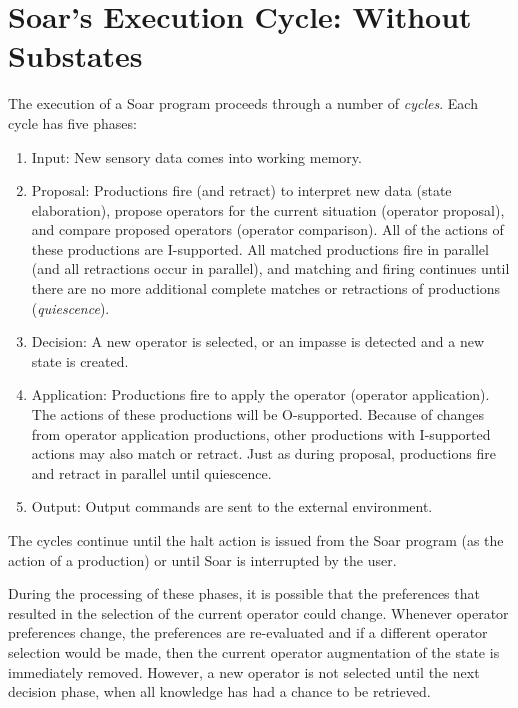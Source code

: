 \section{Soar's Execution Cycle: Without Substates}
\label{ARCH-decision}

The execution of a Soar program proceeds through a number of
\emph{cycles}. Each cycle has five phases:
\begin{enumerate} 
\item Input: New sensory data comes into working memory.
\item Proposal: Productions fire (and retract) to interpret new data (state 
elaboration), propose operators for the current situation (operator
proposal), and compare proposed operators (operator comparison).  All of
the actions of these productions are I-supported.  All matched
productions fire in parallel (and all retractions occur in parallel),
and matching and firing continues until there are no more additional
complete matches or retractions of productions (\emph{quiescence}).
\item Decision: A new operator is selected, or an impasse is detected
and a new state is created.
\item Application: Productions fire to apply the operator (operator
application).  The actions of these productions will be O-supported.
Because of changes from operator application productions, other
productions with I-supported actions may also match or retract. Just as
during proposal, productions fire and retract in parallel until quiescence.
\item Output: Output commands are sent to the external environment.
\end{enumerate}

The cycles continue until the halt action is issued from
the Soar program (as the action of a production) or until Soar is interrupted 
by the user.

During the processing of these phases, it is possible that the
preferences that resulted in the selection of the current operator could
change.  Whenever operator preferences change, the preferences are
re-evaluated and if a different operator selection would be made, then
the current operator augmentation of the state is immediately removed.
However, a new operator is not selected until the next decision phase, when
all knowledge has had a chance to be retrieved.

\begin{figure}
\label{fig:decisioncycle}
\end{figure}

